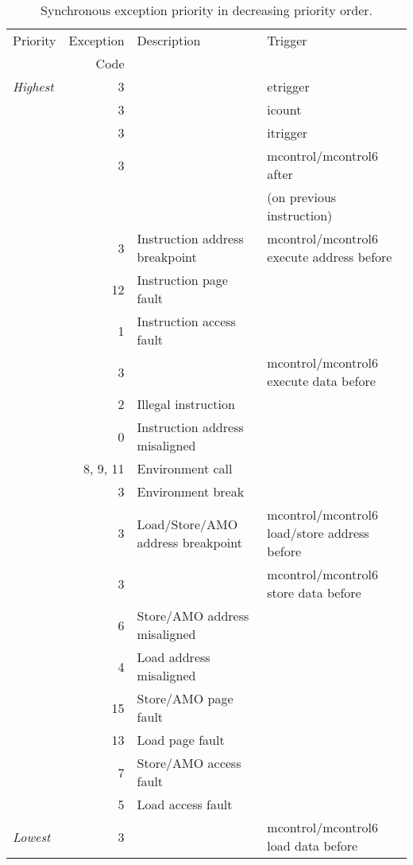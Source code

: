 \begin{table}[H]
\centering
\begin{tabular}{|l|r|l|l|}
  \hline
  Priority      & Exception & Description & Trigger \\
                &      Code &             & \\
  \hline
  {\em Highest} &          3 & & etrigger \\
                &          3 & & icount \\
                &          3 & & itrigger \\
                &          3 & & mcontrol/mcontrol6 after \\
                &            & & \hspace{2em}(on previous instruction) \\
                \hline
                &          3 & Instruction address breakpoint & mcontrol/mcontrol6 execute address before \\ \hline
                &         12 & Instruction page fault & \\ \hline
                &          1 & Instruction access fault & \\ \hline
                &          3 & & mcontrol/mcontrol6 execute data before \\ \hline
                &          2 & Illegal instruction & \\
                &          0 & Instruction address misaligned & \\
                &   8, 9, 11 & Environment call & \\
                &          3 & Environment break & \\
                &          3 & Load/Store/AMO address breakpoint & mcontrol/mcontrol6 load/store address before \\
                &          3 & & mcontrol/mcontrol6 store data before \\ \hline
                &          6 & Store/AMO address misaligned & \\
                &          4 & Load address misaligned & \\ \hline
                &         15 & Store/AMO page fault & \\
                &         13 & Load page fault & \\ \hline
                &          7 & Store/AMO access fault & \\
                &          5 & Load access fault & \\
  {\em Lowest}  &          3 & & mcontrol/mcontrol6 load data before \\
  \hline
\end{tabular}
\caption{Synchronous exception priority in decreasing priority order.}
\label{tab:priority}
\end{table}

